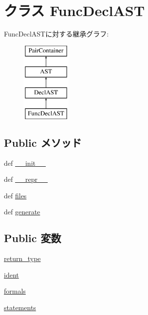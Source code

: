 \hypertarget{classslicc_1_1ast_1_1FuncDeclAST_1_1FuncDeclAST}{
\section{クラス FuncDeclAST}
\label{classslicc_1_1ast_1_1FuncDeclAST_1_1FuncDeclAST}
}
FuncDeclASTに対する継承グラフ:\begin{figure}[H]
\begin{center}
\leavevmode
\includegraphics[height=4cm]{classslicc_1_1ast_1_1FuncDeclAST_1_1FuncDeclAST}
\end{center}
\end{figure}
\subsection*{Public メソッド}
\begin{DoxyCompactItemize}
\item 
def \hyperlink{classslicc_1_1ast_1_1FuncDeclAST_1_1FuncDeclAST_ac775ee34451fdfa742b318538164070e}{\_\-\_\-init\_\-\_\-}
\item 
def \hyperlink{classslicc_1_1ast_1_1FuncDeclAST_1_1FuncDeclAST_ad8b9328939df072e4740cd9a63189744}{\_\-\_\-repr\_\-\_\-}
\item 
def \hyperlink{classslicc_1_1ast_1_1FuncDeclAST_1_1FuncDeclAST_a35b1a87f6fcbddeb5b793b0e415765f8}{files}
\item 
def \hyperlink{classslicc_1_1ast_1_1FuncDeclAST_1_1FuncDeclAST_a4555d1cee0dccf3942ea35fe86de2e8e}{generate}
\end{DoxyCompactItemize}
\subsection*{Public 変数}
\begin{DoxyCompactItemize}
\item 
\hyperlink{classslicc_1_1ast_1_1FuncDeclAST_1_1FuncDeclAST_a8158a2d869c53eb8f38c869b380a1209}{return\_\-type}
\item 
\hyperlink{classslicc_1_1ast_1_1FuncDeclAST_1_1FuncDeclAST_a2fe57e2d3d2cba9a3aeba2f629eaa78b}{ident}
\item 
\hyperlink{classslicc_1_1ast_1_1FuncDeclAST_1_1FuncDeclAST_a79fe00aeb4605bc998a79bd42bed605e}{formals}
\item 
\hyperlink{classslicc_1_1ast_1_1FuncDeclAST_1_1FuncDeclAST_aa25d5649a404c698dcacaa271a285c92}{statements}
\end{DoxyCompactItemize}


